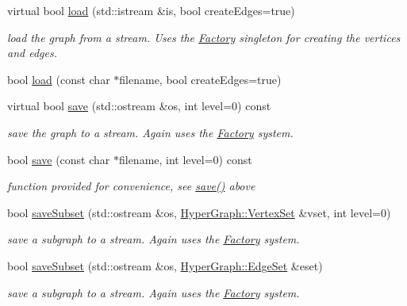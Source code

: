\begin{DoxyCompactItemize}
virtual bool \mbox{\hyperlink{structg2o_1_1_optimizable_graph_a34f4a170d58551ee9efac7a7a78fa833}{load}} (std\+::istream \&is, bool create\+Edges=true)
\begin{DoxyCompactList}\small\item\em load the graph from a stream. Uses the \mbox{\hyperlink{classg2o_1_1_factory}{Factory}} singleton for creating the vertices and edges. \end{DoxyCompactList}\item 
bool \mbox{\hyperlink{structg2o_1_1_optimizable_graph_a305fe91c405fc960df051d9581e524bc}{load}} (const char $\ast$filename, bool create\+Edges=true)
\item 
virtual bool \mbox{\hyperlink{structg2o_1_1_optimizable_graph_abee0b60ade0644904a489564def8ad1d}{save}} (std\+::ostream \&os, int level=0) const
\begin{DoxyCompactList}\small\item\em save the graph to a stream. Again uses the \mbox{\hyperlink{classg2o_1_1_factory}{Factory}} system. \end{DoxyCompactList}\item 
bool \mbox{\hyperlink{structg2o_1_1_optimizable_graph_a29c40a9cb3bf3660e59d55cfad264c71}{save}} (const char $\ast$filename, int level=0) const
\begin{DoxyCompactList}\small\item\em function provided for convenience, see \mbox{\hyperlink{structg2o_1_1_optimizable_graph_abee0b60ade0644904a489564def8ad1d}{save()}} above \end{DoxyCompactList}\item 
bool \mbox{\hyperlink{structg2o_1_1_optimizable_graph_adcf211f9c7bf3ee9dab65b130807402c}{save\+Subset}} (std\+::ostream \&os, \mbox{\hyperlink{classg2o_1_1_hyper_graph_a703938cdb4bb636860eed55a2489d70c}{Hyper\+Graph\+::\+Vertex\+Set}} \&vset, int level=0)
\begin{DoxyCompactList}\small\item\em save a subgraph to a stream. Again uses the \mbox{\hyperlink{classg2o_1_1_factory}{Factory}} system. \end{DoxyCompactList}\item 
bool \mbox{\hyperlink{structg2o_1_1_optimizable_graph_a2a08383ab953d435eaaca6231b64c3b6}{save\+Subset}} (std\+::ostream \&os, \mbox{\hyperlink{classg2o_1_1_hyper_graph_a5e2970e236c0dcb4eff7c205d7b6b4ae}{Hyper\+Graph\+::\+Edge\+Set}} \&eset)
\begin{DoxyCompactList}\small\item\em save a subgraph to a stream. Again uses the \mbox{\hyperlink{classg2o_1_1_factory}{Factory}} system. \end{DoxyCompactList}\item 

\end{DoxyCompactItemize}

